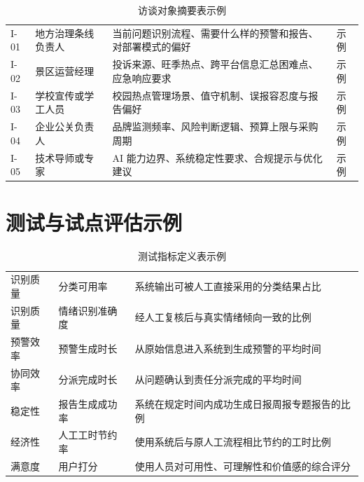 \begin{table}[htbp]
	\centering
	\caption{访谈对象摘要表示例}
	\begin{tabularx}{\textwidth}{|L{1.8cm}L{2.6cm}YL{2.0cm}|}
		\hline
		 &  &                 &  \\
		\hline
		I-01           & 地方治理条线负责人      & 当前问题识别流程、需要什么样的预警和报告、对部署模式的偏好 & 示例             \\
		I-02           & 景区运营经理         & 投诉来源、旺季热点、跨平台信息汇总困难点、应急响应要求   & 示例             \\
		I-03           & 学校宣传或学工人员      & 校园热点管理场景、值守机制、误报容忍度与报告偏好      & 示例             \\
		I-04           & 企业公关负责人        & 品牌监测频率、风险判断逻辑、预算上限与采购周期       & 示例             \\
		I-05           & 技术导师或专家        & AI 能力边界、系统稳定性要求、合规提示与优化建议     & 示例             \\
		\hline
	\end{tabularx}
\end{table}

\section{测试与试点评估示例}

\begin{table}[htbp]
	\centering
	\caption{测试指标定义表示例}
	\begin{tabularx}{\textwidth}{|L{2.4cm}L{2.6cm}Y|}
		\hline
		 &  &           \\
		\hline
		识别质量           & 分类可用率          & 系统输出可被人工直接采用的分类结果占比     \\
		识别质量           & 情绪识别准确度        & 经人工复核后与真实情绪倾向一致的比例      \\
		预警效率           & 预警生成时长         & 从原始信息进入系统到生成预警的平均时间     \\
		协同效率           & 分派完成时长         & 从问题确认到责任分派完成的平均时间       \\
		稳定性            & 报告生成成功率        & 系统在规定时间内成功生成日报周报专题报告的比例 \\
		经济性            & 人工工时节约率        & 使用系统后与原人工流程相比节约的工时比例    \\
		满意度            & 用户打分           & 使用人员对可用性、可理解性和价值感的综合评分  \\
		\hline
	\end{tabularx}
\end{table}

